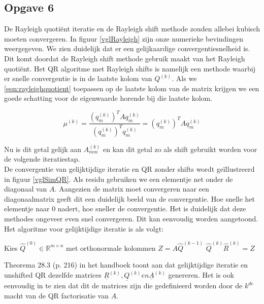 \documentclass[a4paper, 12pt, titlepage]{report}
\begin{document}
\subsection{Opgave 6}
De Rayleigh quoti\"ent iteratie en de Rayleigh shift methode zouden allebei kubisch moeten convergeren. In figuur \ref{vglRayleigh} zijn onze numerieke bevindingen weergegeven. We zien duidelijk dat er een gelijkaardige convergentiesnelheid is. Dit komt doordat de Rayleigh shift methode gebruik maakt van het Rayleigh quoti\"ent. Het QR algoritme met Rayleigh shifts is namelijk een methode waarbij er snelle convergentie is in de laatste kolom van $Q^{(k)}$. Als we \eqref{eqn:rayleighquotient} toepassen op de laatste kolom van de matrix krijgen we een goede schatting voor de eigenwaarde horende bij die laatste kolom. 

\begin{equation}
	\mu^{(k)} = \frac{(q^{(k)}_m)^TAq^{(k)}_m}{(q^{(k)}_m)^Tq^{(k)}_m} = (q^{(k)}_m)^TAq^{(k)}_m
	\label{eqn:rayleighquotient}
\end{equation}

Nu is dit getal gelijk aan $A^{(k)}_{mm}$ en kan dit getal zo als shift gebruikt worden voor de volgende iteratiestap.\\

De convergentie van gelijktijdige iteratie en QR zonder shifts wordt ge\"illustreerd in figuur \ref{vglSimQR}. Als residu gebruiken we een elementje net onder de diagonaal van $A$. Aangezien de matrix moet convergeren naar een diagonaalmatrix geeft dit een duidelijk beeld van de convergentie. Hoe snelle het elementje naar 0 nadert, hoe sneller de convergentie. Het is duidelijk dat deze methodes ongeveer even snel convergeren. Dit kan eenvoudig worden aangetoond. Het algoritme voor gelijktijdige iteratie is als volgt:

\begin{algorithmic}
 \STATE Kies $\hat{Q}^{(0)}\in \mathbb{R}^{m\times n}$ met orthonormale kolommen
 	\STATE $Z = A\hat{Q}^{(k-1)}$
 	\STATE $\hat{Q}^{(k)}\hat{R}^{(k)} = Z$
 \ENDFOR
\end{algorithmic}

Theorema 28.3 (p. 216) in het handboek toont aan dat gelijktijdige iteratie en unshifted QR dezelfde matrices $\underline{R}^{(k)},\underline{Q}^{(k)} en \underline{A}^{(k)}$ genereren. Het is ook eenvoudig in te zien dat dit de matrices zijn die gedefinieerd worden door de $k^{de}$ macht van de QR factorisatie van $A$.\\
\end{document}
